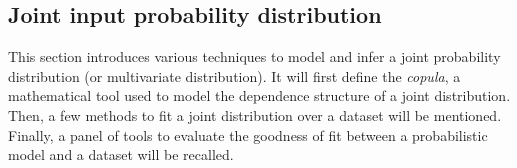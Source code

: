 \subsection{Joint input probability distribution}

This section introduces various techniques to model and infer a joint probability distribution (or multivariate distribution). 
It will first define the \textit{copula}, a mathematical tool used to model the dependence structure of a joint distribution. 
Then, a few methods to fit a joint distribution over a dataset will be mentioned. 
Finally, a panel of tools to evaluate the goodness of fit between a probabilistic model and a dataset will be recalled. 

